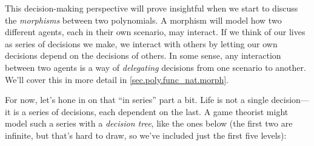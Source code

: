 This decision-making perspective will prove insightful when we start to discuss the \emph{morphisms} between two polynomials.
A morphism will model how two different agents, each in their own scenario, may interact.
If we think of our lives as series of decisions we make, we interact with others by letting our own decisions depend on the decisions of others.
In some sense, any interaction between two agents is a way of \emph{delegating} decisions from one scenario to another.
We'll cover this in more detail in \cref{sec.poly.func_nat.morph}.

For now, let's hone in on that ``in series'' part a bit.
Life is not a single decision---it is a series of decisions, each dependent on the last.
A game theorist might model such a series with a \emph{decision tree}, like the ones below (the first two are infinite, but that’s hard to draw, so we’ve included just the first five levels):
